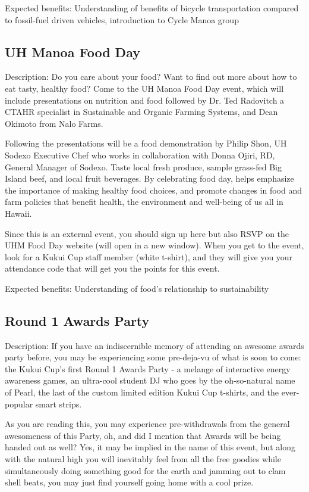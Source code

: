 Expected benefits: Understanding of benefits of bicycle transportation compared to fossil-fuel driven vehicles, introduction to Cycle Manoa group


\subsection{UH Manoa Food Day}

Description: Do you care about your food? Want to find out more about how to eat tasty, healthy food? Come to the UH Manoa Food Day event, which will include presentations on nutrition and food followed by Dr. Ted Radovitch a CTAHR specialist in Sustainable and Organic Farming Systems, and Dean Okimoto from Nalo Farms.

Following the presentations will be a food demonstration by Philip Shon, UH Sodexo Executive Chef who works in collaboration with Donna Ojiri, RD, General Manager of Sodexo. Taste local fresh produce, sample grass-fed Big Island beef, and local fruit beverages. By celebrating food day, helps emphasize the importance of making healthy food choices, and promote changes in food and farm policies that benefit health, the environment and well-being of us all in Hawaii.

Since this is an external event, you should sign up here but also RSVP on the UHM Food Day website (will open in a new window). When you get to the event, look for a Kukui Cup staff member (white t-shirt), and they will give you your attendance code that will get you the points for this event.

Expected benefits: Understanding of food's relationship to sustainability


\subsection{Round 1 Awards Party}

Description: If you have an indiscernible memory of attending an awesome awards party before, you may be experiencing some pre-deja-vu of what is soon to come: the Kukui Cup's first Round 1 Awards Party - a melange of interactive energy awareness games, an ultra-cool student DJ who goes by the oh-so-natural name of Pearl, the last of the custom limited edition Kukui Cup t-shirts, and the ever-popular smart strips.

As you are reading this, you may experience pre-withdrawals from the general awesomeness of this Party, oh, and did I mention that Awards will be being handed out as well? Yes, it may be implied in the name of this event, but along with the natural high you will inevitably feel from all the free goodies while simultaneously doing something good for the earth and jamming out to clam shell beats, you may just find yourself going home with a cool prize. 

